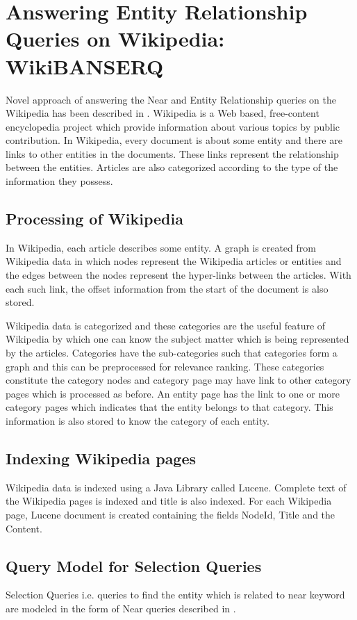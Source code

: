 \documentclass[11pt]{report}
\begin{document}
\chapter{Answering Entity Relationship Queries on Wikipedia: WikiBANSERQ}
Novel approach of answering the Near and Entity Relationship queries on the Wikipedia has been described in \cite{wikibanks}.
Wikipedia is a Web based, free-content encyclopedia project which provide information about various topics by public contribution.
In Wikipedia, every document is about some entity and there are links to other entities in the documents. These links represent the
relationship between the entities. Articles are also categorized according to the type of the information they possess.

\section{Processing of Wikipedia}
In Wikipedia, each article describes some entity. A graph is created from Wikipedia data in which nodes represent the Wikipedia articles or entities
and the edges between the nodes represent the hyper-links between the articles. With each such link, the offset information from the start of the document
is also stored.

Wikipedia data is categorized and these categories are the useful feature of Wikipedia by which one can know the subject matter which is being represented by
the articles. Categories have the sub-categories such that categories form a graph and this can be preprocessed for relevance ranking. These categories constitute
the category nodes and category page may have link to other category pages which is processed as before. An entity page has the link to one or more category pages
which indicates that the entity belongs to that category. This information is also stored to know the category of each entity.

\section{Indexing Wikipedia pages}
Wikipedia data is indexed using a Java Library called Lucene. Complete text of the Wikipedia pages is indexed and title is also indexed. For each Wikipedia
page, Lucene document is created containing the fields NodeId, Title and the Content.

\section{Query Model for Selection Queries}
Selection Queries i.e. queries to find the entity which is related to near keyword are modeled in the form of Near queries described in \cite{sahoo}.
\end{document}
